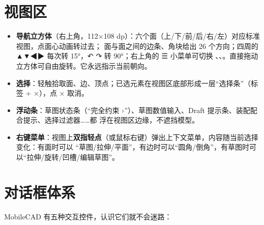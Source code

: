 
\section{视图区}

\begin{itemize}
  \item \textbf{导航立方体}（右上角，112×108 dp）：六个面（上/下/前/后/右/左）对应标准视图，点面心动画转过去；
        面与面之间的边条、角块给出 26 个方向；四周的 ▲▼◀▶ 每次转 15°，↶ ↷ 转 90°；右上角的 ☰ 小菜单可切换
        、、。直接拖动立方体可自由旋转。它永远指示当前朝向。
  \item \textbf{选择}：轻触拾取面、边、顶点；已选元素在视图区底部形成一层“选择条”（标签 + ×），点 × 取消。
  \item \textbf{浮动条}：草图状态条（“完全约束 ›”）、草图数值输入、Draft 提示条、装配配合提示、选择过滤器……都
        浮在视图区边缘，不遮挡模型。
  \item \textbf{右键菜单}：视图上\textbf{双指轻点}（或鼠标右键）弹出上下文菜单，内容随当前选择变化：有面时可以
        “草图/拉伸/平面”，有边时可以“圆角/倒角”，有草图时可以“拉伸/旋转/凹槽/编辑草图”。
\end{itemize}

\section{对话框体系}

MobileCAD 有五种交互控件，认识它们就不会迷路：

